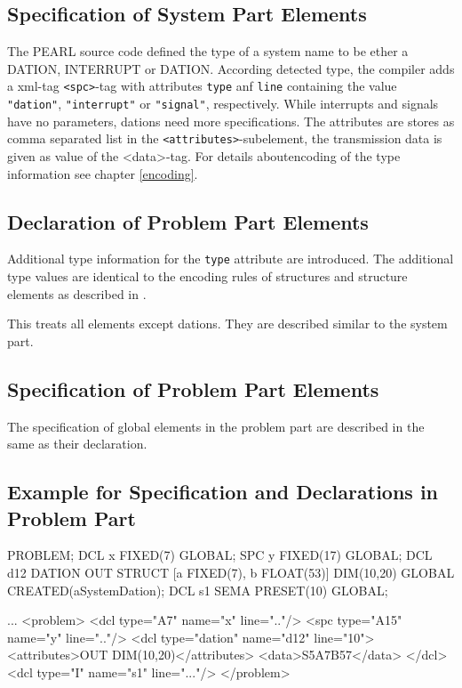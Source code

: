 \subsection{Specification of System Part Elements}
The PEARL source code defined the type of a system name to be ether a DATION, 
INTERRUPT or DATION. According detected type, the compiler 
adds a xml-tag \verb|<spc>|-tag with attributes \verb|type| anf \verb|line|
containing the value \verb|"dation"|, \verb|"interrupt"| or \verb|"signal"|,
 respectively.
While interrupts and signals have no parameters, dations need more
specifications. The attributes are stores as comma separated list in the
\verb|<attributes>|-subelement, the transmission data is given as value
of the <data>-tag. For details aboutencoding of the type information
see chapter \ref{encoding}. 

\subsection{Declaration of Problem Part Elements}

Additional type information for the \verb|type| attribute are introduced.
The additional type values are identical to the  encoding rules of
structures and structure elements  as described in \cite{runtime}.

This treats all elements except dations. They are described similar to the
system part.


\subsection{Specification of Problem Part Elements}
The specification of global  elements in the problem part are described 
in the same as their declaration.

\subsection{Example for Specification and Declarations in Problem Part}

\begin{PEARLCode}
PROBLEM;
   DCL x FIXED(7) GLOBAL;
   SPC y FIXED(17) GLOBAL;
   DCL d12 DATION OUT STRUCT [a FIXED(7), b FLOAT(53)]
     DIM(10,20)  GLOBAL CREATED(aSystemDation);
   DCL s1 SEMA PRESET(10) GLOBAL;
\end{PEARLCode}

\begin{XMLCode}
...
<problem>
  <dcl type="A7" name="x" line=".."/>
  <spc type="A15" name="y" line=".."/>
  <dcl type="dation" name="d12" line="10">
    <attributes>OUT DIM(10,20)</attributes>
    <data>S5A7B57</data>
  </dcl>
  <dcl type="I" name="s1" line="..."/>
</problem>
\end{XMLCode}


